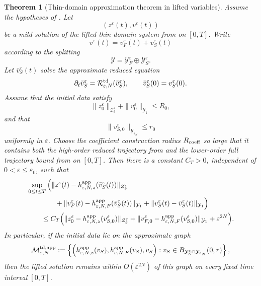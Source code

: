 \documentclass[11pt]{article}
\newtheorem{theorem}{Theorem}[section]
\theoremstyle{definition}
\theoremstyle{remark}
\numberwithin{equation}{section}
\begin{document}
\begin{theorem}[Thin-domain approximation theorem in lifted variables]
\label{thm:thin-domain-approximation}
Assume the hypotheses of
. Let
\[
(z^\varepsilon(t),v^\varepsilon(t))
\]
be a mild solution of the lifted thin-domain system from
 on \([0,T]\). Write
\[
v^\varepsilon(t)=v_F^\varepsilon(t)+v_S^\varepsilon(t)
\]
according to the splitting
\[
\mathcal Y
=
\mathcal Y_F^\varepsilon
\oplus
\mathcal Y_S^\varepsilon.
\]
Let \(\bar v_S^\varepsilon(t)\) solve the approximate reduced equation
\[
\partial_t\bar v_S^\varepsilon
=
\mathcal R_{\varepsilon,N}^{\rm td}(\bar v_S^\varepsilon),
\qquad
\bar v_S^\varepsilon(0)=v_S^\varepsilon(0).
\]
Assume that the initial data satisfy
\[
\|z_0^\varepsilon\|_{\mathcal Z_\theta^\varepsilon}
+
\|v_0^\varepsilon\|_{\mathcal Y_1}
\le R_0,
\]
and that
\[
\|v_{S,0}^\varepsilon\|_{\mathcal Y_{s_N}}\le r_0
\]
uniformly in \(\varepsilon\). Choose the coefficient construction radius
\(R_{\rm coeff}\) so large that it contains both the high-order reduced
trajectory from
and the lower-order full trajectory bound from
 on \([0,T]\).
Then there is
a constant \(C_T>0\), independent of \(0<\varepsilon\le\varepsilon_0\), such
that
\[
\begin{aligned}
&\sup_{0\le t\le T}
\Big(
\|z^\varepsilon(t)
-
h_{\varepsilon,N,z}^{\rm app}(\bar v_S^\varepsilon(t))
\|_{\mathcal Z_\theta^\varepsilon}
\\
&\qquad\qquad
+
\|v_F^\varepsilon(t)
-
h_{\varepsilon,N,F}^{\rm app}(\bar v_S^\varepsilon(t))
\|_{\mathcal Y_1}
+
\|v_S^\varepsilon(t)-\bar v_S^\varepsilon(t)\|_{\mathcal Y_1}
\Big)
\\
&\qquad\le
C_T
\Big(
\|z_0^\varepsilon
-
h_{\varepsilon,N,z}^{\rm app}(v_{S,0}^\varepsilon)
\|_{\mathcal Z_\theta^\varepsilon}
+
\|v_{F,0}^\varepsilon
-
h_{\varepsilon,N,F}^{\rm app}(v_{S,0}^\varepsilon)
\|_{\mathcal Y_1}
+
\varepsilon^{2N}
\Big).
\end{aligned}
\]
In particular, if the initial data lie on the approximate graph
\[
\mathcal M_{\varepsilon,N}^{\rm td,app}
:=
\left\{
\left(
h_{\varepsilon,N,z}^{\rm app}(v_S),
h_{\varepsilon,N,F}^{\rm app}(v_S),
v_S
\right):
v_S\in
B_{\mathcal Y_S^\varepsilon\cap\mathcal Y_{s_N}}(0,r)
\right\},
\]
then the lifted solution remains within \(O(\varepsilon^{2N})\) of this graph
on every fixed time interval \([0,T]\).
\end{theorem}
\end{document}
